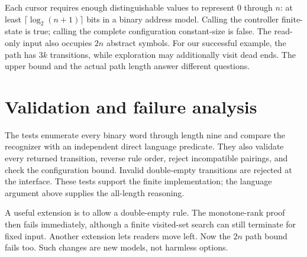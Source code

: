 
Each cursor requires enough distinguishable values to represent $0$ through
$n$: at least $\lceil\log_2(n+1)\rceil$ bits in a binary address model.
Calling the controller finite-state is true; calling the complete configuration
constant-size is false. The read-only input also occupies $2n$ abstract symbols.
For our successful example, the path has $3k$ transitions, while exploration
may additionally visit dead ends. The upper bound and the actual path length
answer different questions.

\section{Validation and failure analysis}
The tests enumerate every binary word through length nine and compare the
recognizer with an independent direct language predicate. They also validate
every returned transition, reverse rule order, reject incompatible pairings,
and check the configuration bound. Invalid double-empty transitions are
rejected at the interface. These tests support the finite implementation;
the language argument above supplies the all-length reasoning.

A useful extension is to allow a double-empty rule. The monotone-rank proof
then fails immediately, although a finite visited-set search can still
terminate for fixed input. Another extension lets readers move left. Now the
$2n$ path bound fails too. Such changes are new models, not harmless options.

